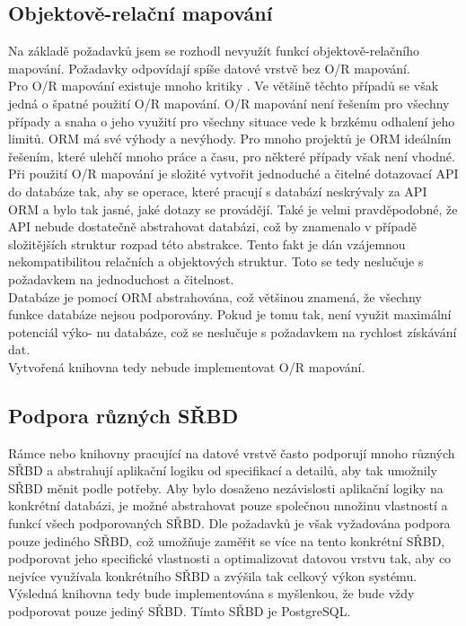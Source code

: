 \documentclass[ing,male,java,dept456]{diploma}						%
\begin{document}
\subsection{Objektově-relační mapování}

Na základě požadavků jsem se rozhodl nevyužít funkcí objektově-relačního mapování. Požadavky odpovídají spíše datové vrstvě bez O/R mapování. \\
Pro O/R mapování existuje mnoho kritiky \cite{seldo, fowler-orm, dbprogrammer-orm, mehdi}. Ve většině těchto případů se však jedná o špatné použití O/R mapování. O/R mapování není řešením pro všechny případy a snaha o jeho využití pro všechny situace vede k brzkému odhalení jeho limitů. ORM má své výhody a nevýhody. Pro mnoho projektů je ORM ideálním řešením, které ulehčí mnoho práce a času, pro některé případy však není vhodné. \\
Při použití O/R mapování je složité vytvořit jednoduché a čitelné dotazovací API do databáze tak, aby se operace, které pracují s databází neskrývaly za API ORM a bylo tak jasné, jaké dotazy se provádějí. Také je velmi pravděpodobné, že API nebude dostatečně abstrahovat databázi, což by znamenalo v případě složitějších struktur rozpad této abstrakce. Tento fakt je dán vzájemnou nekompatibilitou relačních a objektových struktur. Toto se tedy neslučuje s požadavkem na jednoduchost a čitelnost. \\
Databáze je pomocí ORM abstrahována, což většinou znamená, že všechny funkce databáze nejsou podporovány. Pokud je tomu tak, není využit maximální potenciál výko- nu databáze, což se neslučuje s požadavkem na rychlost získávání dat. \\
Vytvořená knihovna tedy nebude implementovat O/R mapování. 

\subsection{Podpora různých SŘBD}

Rámce nebo knihovny pracující na datové vrstvě často podporují mnoho různých SŘBD a abstrahují aplikační logiku od specifikací a detailů, aby tak umožnily SŘBD měnit podle potřeby. Aby bylo dosaženo nezávislosti aplikační logiky na konkrétní databázi, je možné abstrahovat pouze společnou množinu vlastností a funkcí všech podporovaných SŘBD. Dle požadavků je však vyžadována podpora pouze jediného SŘBD, což umožňuje zaměřit se více na tento konkrétní SŘBD, podporovat jeho specifické vlastnosti a optimalizovat datovou vrstvu tak, aby co nejvíce využívala konkrétního SŘBD a zvýšila tak celkový výkon systému. \\
Výsledná knihovna tedy bude implementována s myšlenkou, že bude vždy podporovat pouze jediný SŘBD. Tímto SŘBD je PostgreSQL.
\end{document}
